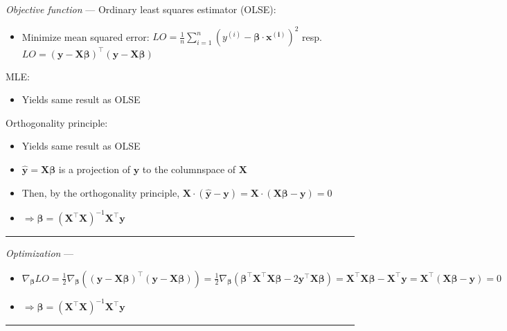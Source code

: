 \emph{Objective function} --- 
Ordinary least squares estimator (OLSE):
\begin{itemize}
    \item Minimize mean squared error: $LO = \frac{1}{n} \sum_{i=1}^n ( y^{(i)} - \boldsymbol{\beta} \cdot \boldsymbol{x^{(i)}} )^2$ resp. $LO = ( \boldsymbol{y} - \boldsymbol{X}\boldsymbol{\beta})^\intercal( \boldsymbol{y} - \boldsymbol{X}\boldsymbol{\beta} )$
\end{itemize}
MLE:
\begin{itemize}
    \item Yields same result as OLSE
\end{itemize}
Orthogonality principle:
\begin{itemize}
    \item Yields same result as OLSE
    \item $\hat{\boldsymbol{y}} = \boldsymbol{X}\boldsymbol{\beta}$ is a projection of $\boldsymbol{y}$ to the columnspace of $\boldsymbol{X}$
    \item Then, by the orthogonality principle, $\boldsymbol{X} \cdot (\hat{\boldsymbol{y}} - \boldsymbol{y}) = \boldsymbol{X} \cdot (\boldsymbol{X}\boldsymbol{\beta} - \boldsymbol{y}) = 0$
    \item $\Rightarrow \boldsymbol{\beta} = (\boldsymbol{X}^\intercal \boldsymbol{X})^{-1}  \boldsymbol{X}^\intercal \boldsymbol{y}$
\end{itemize}

{\color{lightgray}\hrule height 0.001mm}

\emph{Optimization} ---
\begin{itemize}
    \item $\nabla_{\boldsymbol{\beta}} LO = \frac{1}{2} \nabla_{\boldsymbol{\beta}} (( \boldsymbol{y} - \boldsymbol{X}\boldsymbol{\beta})^\intercal( \boldsymbol{y} - \boldsymbol{X}\boldsymbol{\beta} )) = \frac{1}{2} \nabla_{\boldsymbol{\beta}} (\boldsymbol{\beta}^\intercal \boldsymbol{X}^\intercal \boldsymbol{X} \boldsymbol{\beta} - 2 \boldsymbol{y}^\intercal \boldsymbol{X} \boldsymbol{\beta}) = \boldsymbol{X}^\intercal \boldsymbol{X} \boldsymbol{\beta} - \boldsymbol{X}^\intercal \boldsymbol{y} = \boldsymbol{X}^\intercal (\boldsymbol{X} \boldsymbol{\beta} - \boldsymbol{y}) = 0$
    \item $\Rightarrow \boldsymbol{\beta} = (\boldsymbol{X}^\intercal \boldsymbol{X})^{-1}  \boldsymbol{X}^\intercal \boldsymbol{y}$
\end{itemize}

{\color{lightgray}\hrule height 0.001mm}

